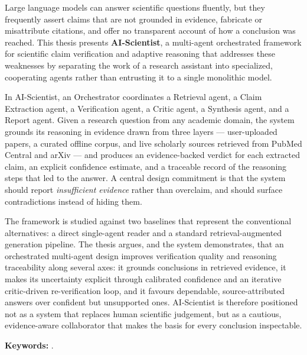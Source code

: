 
Large language models can answer scientific questions fluently, but they frequently assert claims that are not
grounded in evidence, fabricate or misattribute citations, and offer no transparent account of how a conclusion
was reached. This thesis presents \textbf{AI-Scientist}, a multi-agent orchestrated framework for scientific
claim verification and adaptive reasoning that addresses these weaknesses by separating the work of a research
assistant into specialized, cooperating agents rather than entrusting it to a single monolithic model.

In AI-Scientist, an Orchestrator coordinates a Retrieval agent, a Claim Extraction agent, a Verification agent,
a Critic agent, a Synthesis agent, and a Report agent. Given a research question from any academic
domain, the system grounds its reasoning in evidence drawn from three layers --- user-uploaded papers, a curated
offline corpus, and live scholarly sources retrieved from PubMed Central and arXiv --- and produces an
evidence-backed verdict for each extracted claim, an explicit confidence estimate, and a traceable record of the
reasoning steps that led to the answer. A central design commitment is that the system should report
\emph{insufficient evidence} rather than overclaim, and should surface contradictions instead of hiding them.

The framework is studied against two baselines that represent the conventional alternatives: a direct
single-agent reader and a standard retrieval-augmented generation pipeline. The thesis argues, and the system
demonstrates, that an orchestrated multi-agent design improves verification quality and reasoning traceability
along several axes: it grounds conclusions in retrieved evidence, it makes its uncertainty explicit through
calibrated confidence and an iterative critic-driven re-verification loop, and it favours dependable,
source-attributed answers over confident but unsupported ones. AI-Scientist is therefore positioned not as a
system that replaces human scientific judgement, but as a cautious, evidence-aware collaborator that makes the
basis for every conclusion inspectable.

\vspace{1em}
\noindent\textbf{Keywords:} \ThesisKeywords.
\clearpage
